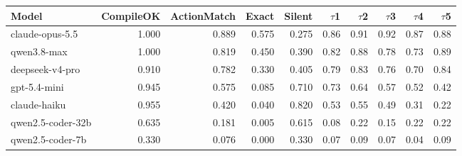 \begin{tabular}{lrrrrrrrrr}
\toprule
Model & CompileOK & ActionMatch & Exact & Silent & $\tau$1 & $\tau$2 & $\tau$3 & $\tau$4 & $\tau$5 \\
\midrule
claude-opus-5.5 & 1.000 & 0.889 & 0.575 & 0.275 & 0.86 & 0.91 & 0.92 & 0.87 & 0.88 \\
qwen3.8-max & 1.000 & 0.819 & 0.450 & 0.390 & 0.82 & 0.88 & 0.78 & 0.73 & 0.89 \\
deepseek-v4-pro & 0.910 & 0.782 & 0.330 & 0.405 & 0.79 & 0.83 & 0.76 & 0.70 & 0.84 \\
gpt-5.4-mini & 0.945 & 0.575 & 0.085 & 0.710 & 0.73 & 0.64 & 0.57 & 0.52 & 0.42 \\
claude-haiku & 0.955 & 0.420 & 0.040 & 0.820 & 0.53 & 0.55 & 0.49 & 0.31 & 0.22 \\
qwen2.5-coder-32b & 0.635 & 0.181 & 0.005 & 0.615 & 0.08 & 0.22 & 0.15 & 0.22 & 0.22 \\
qwen2.5-coder-7b & 0.330 & 0.076 & 0.000 & 0.330 & 0.07 & 0.09 & 0.07 & 0.04 & 0.09 \\
\bottomrule
\end{tabular}
